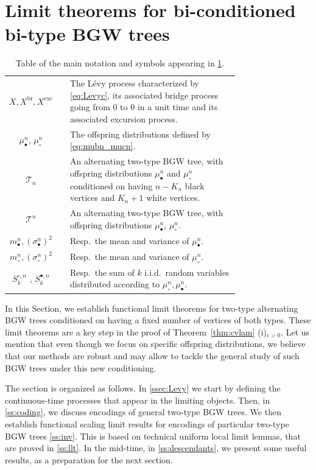 \documentclass[10pt]{amsart}
\theoremstyle{definition}\newtheorem{defi}[theo]{Definition}\newtheorem{rema}[theo]{Remark}\newtheorem{exam}[theo]{Example}\newtheorem{exem}[theo]{Example}\newtheorem{nota}[theo]{Notation}
\def\mubn{\mu_{\bullet}^{n}}
\def\mucn{\mu_{\circ}^{n}}
\def\mbn{m_{\bullet}^{n}}
\def\mcn{m_{\circ}^{n}}
\def\scn{\sigma_{\circ}^{n}}
\def\sbn{\sigma_{\bullet}^{n}}
\def\Sbn{S^{\bullet,n}}
\def\Scn{S^{\circ,n}}
\def \Xexc{X^{\mathrm{exc}}}
\def \Xbr{X^{\mathrm{br}}}
\begin{document}
\section{Limit theorems for bi-conditioned bi-type BGW trees}
\label{sec:limitheorems}


\begin{table}[htbp]\caption{Table of the main notation and symbols appearing in \cref{sec:limitheorems}.}
\centering
\begin{tabular}{c c p{0.75 \linewidth} }
\toprule
$X, \Xbr,\Xexc$ && The L\'evy process characterized by \eqref{eq:Levyc},  its associated  bridge process going from $0$ to $0$ in a unit time and its associated excursion process.\\
$\mubn$, $\mucn$&& The offspring distributions defined by \eqref{eq:mubn_mucn}.\\
$\mathscr{T}_{n}$ & & An alternating two-type BGW tree, with offspring distributions $\mubn$ and $\mucn$ conditioned on having $n-K_{n}$ black vertices and $K_{n}+1$ white vertices.
 \\
 $\mathscr{T}^{n}$ & & An alternating two-type BGW tree, with offspring distributions $\mubn$, $\mucn$.\\
 $\mbn,(\sbn)^{2}$ & & Resp.~the mean and variance of $\mubn$.\\
 $ \mcn,(\scn)^{2}$ & & Resp.~the mean and variance of $\mucn$.\\
 $\Scn_{k}$ , $\Sbn_{k}$ && Resp.~the sum of $k$ i.i.d.\ random variables distributed according to $\mucn,\mubn$.\\
\bottomrule
\end{tabular}
\label{tab:seclim}
\end{table}


In this Section, we establish functional limit theorems for two-type alternating BGW trees conditioned on having a fixed number of vertices of both types.
These limit theorems are a key step in the proof of Theorem~\ref{thm:cvlam} (i)$_{c>0}$.
Let us mention that even though we focus on  specific offspring distributions,
we believe that our methods are robust and may allow to tackle the general study of such BGW trees under this new conditioning.

The section is organized as follows.
In \cref{ssec:Levy} we start by defining the continuous-time processes
that appear in the limiting objects.
Then, in \cref{ss:coding}, we discuss encodings of general two-type BGW trees.
We then establish functional scaling limit results for encodings
of particular two-type BGW trees \cref{ss:inv}.
This is based on technical uniform local limit lemmas,
that are proved in \cref{ss:llt}.
In the mid-time, in \cref{ss:descendants},
we present some useful results, as a preparation for the next section.
\end{document}
